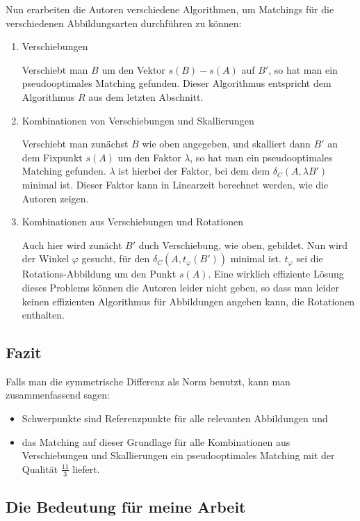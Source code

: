 Nun erarbeiten die Autoren verschiedene Algorithmen, um Matchings für die verschiedenen Abbildungsarten durchführen zu können:
\begin{enumerate}
\item Verschiebungen

Verschiebt man $B$ um den Vektor $s(B)-s(A)$ auf $B'$, so hat man ein pseudooptimales Matching gefunden. Dieser Algorithmus entspricht dem Algorithmus $R$ aus dem letzten Abschnitt.

\item Kombinationen von Verschiebungen und Skallierungen

Verschiebt man zunächst $B$ wie oben angegeben, und skalliert dann $B'$ an dem Fixpunkt $s(A)$ um den Faktor $\lambda$, so hat man ein pseudooptimales Matching gefunden. $\lambda$ ist hierbei der Faktor, bei dem dem $\delta_C(A,\lambda B')$ minimal ist. Dieser Faktor kann in Linearzeit berechnet werden, wie die Autoren zeigen.

\item Kombinationen aus Verschiebungen und Rotationen

Auch hier wird zunächt $B'$ duch Verschiebung, wie oben, gebildet. Nun wird der Winkel $\varphi$ gesucht, für den $\delta_C(A,t_\varphi( B'))$ minimal ist. $t_\varphi$ sei die Rotations-Abbildung um den Punkt $s(A)$. Eine wirklich effiziente Lösung dieses Problems können die Autoren leider nicht geben, so dass man leider keinen effizienten Algorithmus für Abbildungen angeben kann, die Rotationen enthalten. 
\end{enumerate}

\subsection{Fazit}

Falls man die symmetrische Differenz als Norm benutzt, kann man  zusammenfassend sagen:
\begin{itemize}
\item Schwerpunkte sind Referenzpunkte für alle relevanten Abbildungen und
\item das Matching auf dieser Grundlage für alle Kombinationen aus Verschiebungen und Skallierungen ein pseudooptimales Matching mit der Qualität $\frac{11}{3}$ liefert. 
\end{itemize} 
\subsection{Die Bedeutung für meine Arbeit}\label{BedeutungAFRW}

